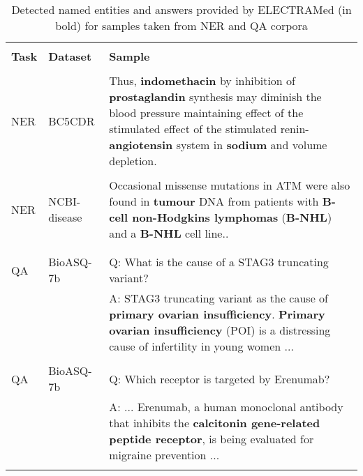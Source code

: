 \documentclass{article}
\begin{document}
\begin{table*}[!t]
\caption{Detected named entities and answers provided by ELECTRAMed (in bold) for samples taken from NER and QA corpora}
\label{table_samples}
\centering 
{\begin{tabular} {p{2cm}p{2cm}p{11cm}} 
\hline \\[-6pt]
\textbf{Task} & \textbf{Dataset} & \textbf{Sample} 
\\ [+4pt]
\hline 
\\[-6pt]
NER & BC5CDR & Thus, \textbf{indomethacin} by inhibition of \textbf{prostaglandin} synthesis may diminish the blood pressure maintaining effect of the stimulated effect of the stimulated renin-\textbf{angiotensin} system in \textbf{sodium} and volume depletion. \\ 
    &   &   \\
NER & NCBI-disease & Occasional missense mutations in ATM were also found in \textbf{tumour} DNA from patients with \textbf{B-cell non-Hodgkins lymphomas} (\textbf{B-NHL}) and a \textbf{B-NHL} cell line.. \\ 
\\[-6pt]
\hline
\\[-6pt]

QA & BioASQ-7b & Q: What is the cause of a STAG3 truncating variant? \\ 
  &           & A: STAG3 truncating variant as the cause of \textbf{primary ovarian insufficiency}. \textbf{Primary ovarian insufficiency} (POI) is a distressing cause of infertility in young women ... \\
    &   &   \\ 
QA & BioASQ-7b & Q: Which receptor is targeted by Erenumab? \\ 
  &           & A: ... Erenumab, a human monoclonal antibody that inhibits the \textbf{calcitonin gene-related peptide receptor}, is being evaluated for migraine prevention ... \\ 
\\[-6pt]  
\hline
\end{tabular}}{}
\end{table*}
\end{document}
